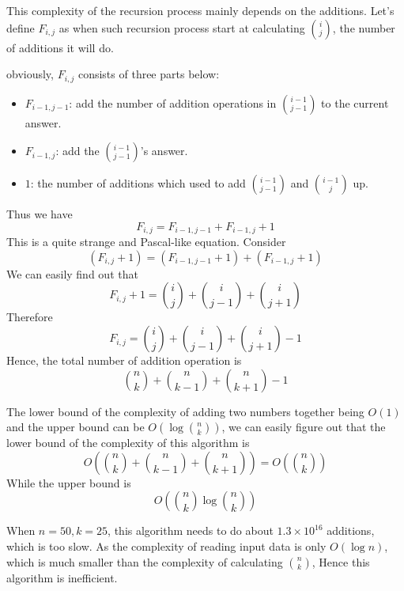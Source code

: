 This complexity of the recursion process mainly depends on the additions.
Let's define $F_{i, j}$ as when such recursion process start at calculating $\binom{i}{j}$,
the number of additions it will do.

obviously, $F_{i, j}$ consists of three parts below:
\begin{itemize}
\item $F_{i - 1, j - 1}$: add the number of addition operations in $\binom{i - 1}{j - 1}$ to the current answer.
\item $F_{i - 1, j}$: add the $\binom{i - 1}{j - 1}$'s answer.
\item $1$: the number of additions which used to add $\binom{i - 1}{j - 1}$ and $\binom{i - 1}{j}$ up.
\end{itemize}

Thus we have
\begin{equation}\label{equation3}
F_{i, j} = F_{i - 1, j - 1} + F_{i - 1, j} + 1
\end{equation}
This is a quite strange and Pascal-like equation.
Consider
\[(F_{i, j} + 1) = (F_{i - 1, j - 1} + 1) + (F_{i-1, j} + 1)\]
We can easily find out that
\[F_{i, j} + 1 = \binom{i}{j} + \binom{i}{j-1} + \binom{i}{j+1}\]
Therefore
\begin{equation}\label{equation4}
F_{i, j} = \binom{i}{j} + \binom{i}{j-1} + \binom{i}{j+1} - 1
\end{equation}
Hence, the total number of addition operation is
\[\binom{n}{k} + \binom{n}{k-1} + \binom{n}{k+1} - 1\]

The lower bound of the complexity of adding two numbers together being $O(1)$ and the upper bound can be $O(\log\binom{n}{k})$,
we can easily figure out that the lower bound of the complexity of this algorithm is
\[O\left(\binom{n}{k} + \binom{n}{k-1} + \binom{n}{k+1}\right) = O\left(\binom{n}{k}\right)\]
While the upper bound is
\[O\left(\binom{n}{k}\log \binom{n}{k}\right)\]

When $n = 50, k = 25$, this algorithm needs to do about $1.3 \times 10^{16}$ additions, which is too slow. As the complexity of reading input data is only $O(\log n)$, which is much smaller than the complexity of calculating $\binom{n}{k}$, Hence this algorithm is inefficient.
